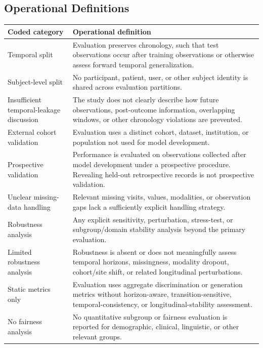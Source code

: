 \documentclass[11pt]{article}
\theoremstyle{plain}
\theoremstyle{definition}
\theoremstyle{remark}
\begin{document}
\subsection{Operational Definitions}
\label{sec:appendix_operational_definitions}
\begin{table}[!t]
\centering
\small
\setlength{\tabcolsep}{4pt}
\renewcommand{\arraystretch}{1.02}
\begin{tabularx}{\textwidth}{p{3.2cm}X}
\toprule
\rowcolor{gray!18}
\textbf{Coded category} & \textbf{Operational definition} \\
\midrule
Temporal split & Evaluation preserves chronology, such that test observations occur after training observations or otherwise assess forward temporal generalization. \\
Subject-level split & No participant, patient, user, or other subject identity is shared across evaluation partitions. \\
Insufficient temporal-leakage discussion & The study does not clearly describe how future observations, post-outcome information, overlapping windows, or other chronology violations are prevented. \\
External cohort validation & Evaluation uses a distinct cohort, dataset, institution, or population not used for model development. \\
Prospective validation & Performance is evaluated on observations collected after model development under a prospective procedure. Revealing held-out retrospective records is not prospective validation. \\
Unclear missing-data handling & Relevant missing visits, values, modalities, or observation gaps lack a sufficiently explicit handling strategy. \\
Robustness analysis & Any explicit sensitivity, perturbation, stress-test, or subgroup/domain stability analysis beyond the primary evaluation. \\
Limited robustness analysis & Robustness is absent or does not meaningfully assess temporal horizons, missingness, modality dropout, cohort/site shift, or related longitudinal perturbations. \\
Static metrics only & Evaluation uses aggregate discrimination or generation metrics without horizon-aware, transition-sensitive, temporal-consistency, or longitudinal-stability assessment. \\
No fairness analysis & No quantitative subgroup or fairness evaluation is reported for demographic, clinical, linguistic, or other relevant groups. \\

\end{tabularx}
\end{table}
\end{document}
